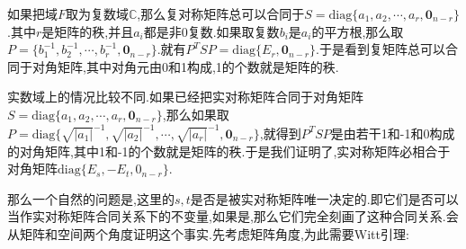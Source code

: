 如果把域$F$取为复数域$\mathbb{C}$,那么复对称矩阵总可以合同于$S=\mathrm{diag}\{a_1,a_2,\cdots,a_r,\textbf{0}_{n-r}\}$.其中$r$是矩阵的秩,并且$a_i$都是非0复数.如果取复数$b_i$是$a_i$的平方根,那么取$P=\{b_1^{-1},b_2^{-1},\cdots,b_r^{-1},\textbf{0}_{n-r}\}$.就有$P^TSP=\mathrm{diag}\{E_r,\textbf{0}_{n-r}\}$.于是看到复矩阵总可以合同于对角矩阵,其中对角元由0和1构成,1的个数就是矩阵的秩.

实数域上的情况比较不同.如果已经把实对称矩阵合同于对角矩阵$S=\mathrm{diag}\{a_1,a_2,\cdots,a_r,\textbf{0}_{n-r}\}$,那么如果取$P=\mathrm{diag}\{\sqrt{|a_1|}^{-1},\sqrt{|a_2|}^{-1},\cdots,\sqrt{|a_r|}^{-1},\textbf{0}_{n-r}\}$,就得到$P^TSP$是由若干1和-1和0构成的对角矩阵,其中1和-1的个数就是矩阵的秩.于是我们证明了,实对称矩阵必相合于对角矩阵$\mathrm{diag}\{E_s,-E_t,0_{n-r}\}$.

那么一个自然的问题是,这里的$s,t$是否是被实对称矩阵唯一决定的.即它们是否可以当作实对称矩阵合同关系下的不变量,如果是,那么它们完全刻画了这种合同关系.会从矩阵和空间两个角度证明这个事实.先考虑矩阵角度,为此需要Witt引理:

